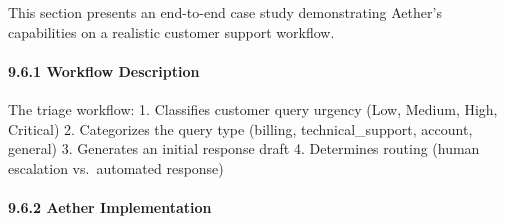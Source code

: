\documentclass[
]{article}
\begin{document}
This section presents an end-to-end case study demonstrating Aether's
capabilities on a realistic customer support workflow.

\paragraph{9.6.1 Workflow Description}\label{workflow-description}

The triage workflow: 1. Classifies customer query urgency (Low, Medium,
High, Critical) 2. Categorizes the query type (billing,
technical\_support, account, general) 3. Generates an initial response
draft 4. Determines routing (human escalation vs.~automated response)

\paragraph{9.6.2 Aether Implementation}\label{aether-implementation}
\end{document}

